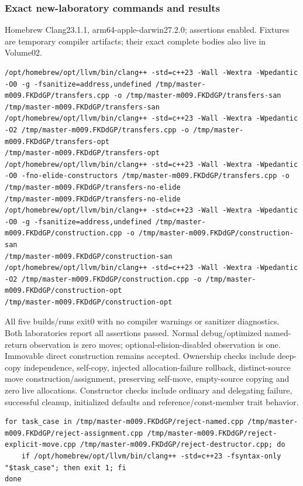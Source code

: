 \subsubsection{Exact new-laboratory commands and results}\label{appendix-a103e7846d21-exact-new-laboratory-commands-and-results}

Homebrew Clang23.1.1, arm64-apple-darwin27.2.0; assertions enabled. Fixtures are temporary compiler artifacts; their exact complete bodies also live in Volume02.

\begin{verbatim}
/opt/homebrew/opt/llvm/bin/clang++ -std=c++23 -Wall -Wextra -Wpedantic -O0 -g -fsanitize=address,undefined /tmp/master-m009.FKDdGP/transfers.cpp -o /tmp/master-m009.FKDdGP/transfers-san
/tmp/master-m009.FKDdGP/transfers-san
/opt/homebrew/opt/llvm/bin/clang++ -std=c++23 -Wall -Wextra -Wpedantic -O2 /tmp/master-m009.FKDdGP/transfers.cpp -o /tmp/master-m009.FKDdGP/transfers-opt
/tmp/master-m009.FKDdGP/transfers-opt
/opt/homebrew/opt/llvm/bin/clang++ -std=c++23 -Wall -Wextra -Wpedantic -O0 -fno-elide-constructors /tmp/master-m009.FKDdGP/transfers.cpp -o /tmp/master-m009.FKDdGP/transfers-no-elide
/tmp/master-m009.FKDdGP/transfers-no-elide
/opt/homebrew/opt/llvm/bin/clang++ -std=c++23 -Wall -Wextra -Wpedantic -O0 -g -fsanitize=address,undefined /tmp/master-m009.FKDdGP/construction.cpp -o /tmp/master-m009.FKDdGP/construction-san
/tmp/master-m009.FKDdGP/construction-san
/opt/homebrew/opt/llvm/bin/clang++ -std=c++23 -Wall -Wextra -Wpedantic -O2 /tmp/master-m009.FKDdGP/construction.cpp -o /tmp/master-m009.FKDdGP/construction-opt
/tmp/master-m009.FKDdGP/construction-opt
\end{verbatim}

All five builds/runs exit0 with no compiler warnings or sanitizer diagnostics. Both laboratories report all assertions passed. Normal debug/optimized named-return observation is zero moves; optional-elision-disabled observation is one. Immovable direct construction remains accepted. Ownership checks include deep-copy independence, self-copy, injected allocation-failure rollback, distinct-source move construction/assignment, preserving self-move, empty-source copying and zero live allocations. Constructor checks include ordinary and delegating failure, successful cleanup, initialized defaults and reference/const-member trait behavior.

\begin{verbatim}
for task_case in /tmp/master-m009.FKDdGP/reject-named.cpp /tmp/master-m009.FKDdGP/reject-assignment.cpp /tmp/master-m009.FKDdGP/reject-explicit-move.cpp /tmp/master-m009.FKDdGP/reject-destructor.cpp; do
    if /opt/homebrew/opt/llvm/bin/clang++ -std=c++23 -fsyntax-only "$task_case"; then exit 1; fi
done
\end{verbatim}

